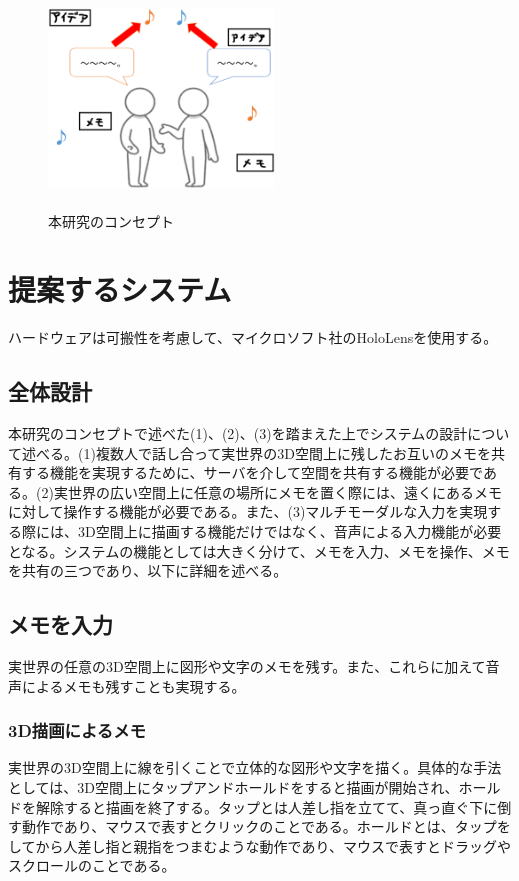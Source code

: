 \documentclass{hissymp}
\begin{document}
\begin{figure}[h]
  \begin{center}
    \includegraphics[clip,height=5.0cm,width=6.0cm]{./concept.eps}
    \caption{本研究のコンセプト}
    \label{fig:concept}
  \end{center}
\end{figure}



\section{提案するシステム}
ハードウェアは可搬性を考慮して、マイクロソフト社のHoloLens\cite{tex6}を使用する。

\subsection{全体設計}
本研究のコンセプトで述べた(1)、(2)、(3)を踏まえた上でシステムの設計について述べる。(1)複数人で話し合って実世界の3D空間上に残したお互いのメモを共有する機能を実現するために、サーバを介して空間を共有する機能が必要である。(2)実世界の広い空間上に任意の場所にメモを置く際には、遠くにあるメモに対して操作する機能が必要である。また、(3)マルチモーダルな入力を実現する際には、3D空間上に描画する機能だけではなく、音声による入力機能が必要となる。システムの機能としては大きく分けて、メモを入力、メモを操作、メモを共有の三つであり、以下に詳細を述べる。

\subsection{メモを入力}
実世界の任意の3D空間上に図形や文字のメモを残す。また、これらに加えて音声によるメモも残すことも実現する。

\subsubsection{3D描画によるメモ}
実世界の3D空間上に線を引くことで立体的な図形や文字を描く。具体的な手法としては、3D空間上にタップアンドホールドをすると描画が開始され、ホールドを解除すると描画を終了する。タップとは人差し指を立てて、真っ直ぐ下に倒す動作であり、マウスで表すとクリックのことである。ホールドとは、タップをしてから人差し指と親指をつまむような動作であり、マウスで表すとドラッグやスクロールのことである。
\end{document}

